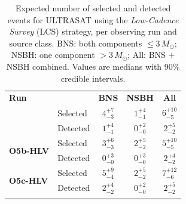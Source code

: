 \begin{table}
\renewcommand\arraystretch{1.3}
\setlength{\tabcolsep}{0.3cm}
\centering
\caption{Expected number of selected and detected events for ULTRASAT using the \emph{Low-Cadence Survey} (LCS) strategy, per observing run and source class. BNS: both components $\leq 3\,M_\odot$; NSBH: one component $> 3\,M_\odot$; All: BNS $+$ NSBH combined. Values are medians with 90\% credible intervals.}
\label{tab:ultrasat-non-overlap-selected-detected-1yr}
\begin{tabular}{llccc}
\Xhline{3\arrayrulewidth}
\textbf{Run} & & \textbf{BNS} & \textbf{NSBH} & \textbf{All} \\
\Xhline{3\arrayrulewidth}
\multirow{2}{*}{\textbf{O5a-HLV}} & Selected & $4_{-3}^{+7}$ & $1_{-1}^{+4}$ & $6_{-5}^{+10}$ \\
 & Detected & $1_{-1}^{+4}$ & $0_{-0}^{+2}$ & $2_{-2}^{+5}$ \\
\hline
\multirow{2}{*}{\textbf{O5b-HLV}} & Selected & $3_{-3}^{+6}$ & $2_{-2}^{+5}$ & $5_{-5}^{+10}$ \\
 & Detected & $0_{-0}^{+3}$ & $0_{-0}^{+3}$ & $2_{-2}^{+4}$ \\
\hline
\multirow{2}{*}{\textbf{O5c-HLV}} & Selected & $5_{-4}^{+9}$ & $2_{-2}^{+5}$ & $7_{-6}^{+12}$ \\
 & Detected & $2_{-2}^{+4}$ & $0_{-0}^{+2}$ & $2_{-2}^{+5}$ \\
\Xhline{3\arrayrulewidth}
\end{tabular}
\end{table}
